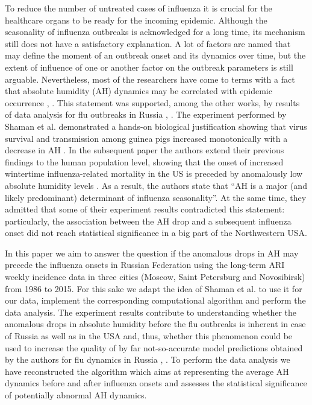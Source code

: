 \documentclass[3p,times,procedia]{elsarticle}
\begin{document}
To reduce the number of untreated cases of influenza it is crucial for the healthcare organs to be ready for the incoming epidemic. Although the seasonality of influenza outbreaks is acknowledged for a long time, its mechanism still does not have a satisfactory explanation. A lot of factors are named that may define the moment of an outbreak onset and its dynamics over time, but the extent of influence of one or another factor on the outbreak parameters is still arguable. Nevertheless, most of the researchers have come to terms with a fact that absolute humidity (AH) dynamics may be correlated with epidemic occurrence \cite{tamerius2011global}, \cite{van2012role}. This statement was supported, among the other works, by results of data analysis for flu outbreaks in Russia \cite{Leonenko2016}, \cite{romanyukha2011origin}. The experiment performed by Shaman et al. demonstrated a hands-on biological justification showing that virus survival and transmission among guinea pigs increased monotonically with a decrease in AH \cite{shaman2009absolute}. In the subsequent paper the authors extend their previous findings to the human population level, showing that the onset of increased wintertime influenza-related mortality in the US is preceded by anomalously low absolute humidity levels \cite{shaman2010absolute}. As a result, the authors state that ``AH is a major (and likely predominant) determinant of influenza seasonality''. At the same time, they admitted that some of their experiment results contradicted this statement: particularly, the association between the AH drop and a subsequent influenza onset did not reach statistical significance in a big part of the Northwestern USA.

In this paper we aim to answer the question if the anomalous drops in AH may precede the influenza onsets in Russian Federation using the long-term ARI weekly incidence data in three cities (Moscow, Saint Petersburg and Novosibirsk) from 1986 to 2015. For this sake we adapt the idea of Shaman et al. to use it for our data, implement the corresponding computational algorithm and perform the data analysis. The experiment results contribute to understanding whether the anomalous drops in absolute humidity before the flu outbreaks is inherent in case of Russia as well as in the USA and, thus, whether this phenomenon could be used to increase the quality of by far not-so-accurate model predictions obtained by the authors for flu dynamics in Russia \cite{leonenko2016mathbio}, \cite{Leon_Novo_Ong}. To perform the data analysis we have reconstructed the algorithm which aims at representing the average AH dynamics before and after influenza onsets and assesses the statistical significance of potentially abnormal AH dynamics.
\end{document}
